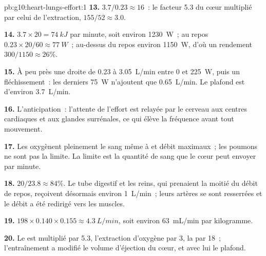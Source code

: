 \begin{solution}{pb:g10:heart-lungs-effort:1}
\textbf{13.} $3.7/0.23 \approx 16$~: le facteur 5.3 du cœur multiplié
par celui de l'extraction, $155/52 \approx 3.0$.

\textbf{14.} $3.7 \times 20 = \qty{74}{kJ}$ par minute, soit environ
\qty{1230}{W}~; au repos $0.23 \times 20/60 \approx \qty{77}{W}$~;
au-dessus du repos environ \qty{1150}{W}, d'où un rendement $300/1150 \approx
26\%$.

\textbf{15.} À peu près une droite de \num{0.23} à \qty{3.05}{L/min}
entre 0 et \qty{225}{W}, puis un fléchissement~: les derniers
\qty{75}{W} n'ajoutent que \qty{0.65}{L/min}. Le plafond est d'environ
\qty{3.7}{L/min}.

\textbf{16.} L'anticipation~: l'attente de l'effort est relayée par le
cerveau aux centres cardiaques et aux glandes surrénales, ce qui élève
la fréquence avant tout mouvement.

\textbf{17.} Les  oxygènent pleinement le sang même à
 et débit maximaux~; les poumons ne sont pas la limite. La
limite est la quantité de sang que le cœur peut envoyer par minute.

\textbf{18.} $20/23.8 \approx 84\%$. Le tube digestif et les reins, qui
prenaient la moitié du débit de repos, reçoivent désormais environ
\qty{1}{L/min}~; leurs artères se sont resserrées et le débit a été
redirigé vers les muscles.

\textbf{19.} $198 \times 0.140 \times 0.155 \approx \qty{4.3}{L/min}$,
soit environ \qty{63}{mL/min} par kilogramme.

\textbf{20.} Le  est multiplié par 5.3,
l'extraction d'oxygène par 3, la  par 18~;
l'entraînement a modifié le volume d'éjection du cœur, et avec lui le
plafond.
\end{solution}
